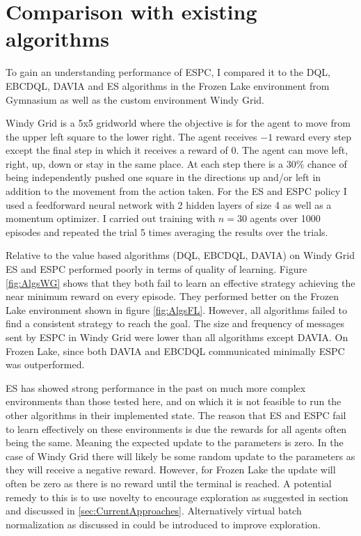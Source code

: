 \section{Comparison with existing algorithms}
To gain an understanding performance of ESPC, I compared it to the DQL, EBCDQL, DAVIA and ES algorithms in the Frozen Lake environment from Gymnasium as well as the custom environment Windy Grid.

Windy Grid is a 5x5 gridworld where the objective is for the agent to move from the upper left square to the lower right. The agent receives $-1$ reward every step except the final step in which it receives a reward of $0$. The agent can move left, right, up, down or stay in the same place. At each step there is a $30\%$ chance of being independently pushed one square in the directions up and/or left in addition to the movement from the action taken. For the ES and ESPC policy I used a feedforward neural network with 2 hidden layers of size 4 as well as a momentum optimizer.
I carried out training with $n=30$ agents over 1000 episodes and repeated the trial 5 times averaging the results over the trials. 

Relative to the value based algorithms (DQL, EBCDQL, DAVIA) on Windy Grid ES and ESPC performed poorly in terms of quality of learning. Figure \ref{fig:AlgsWG} shows that they both fail to learn an effective strategy achieving the near minimum reward on every episode. They performed better on the Frozen Lake environment shown in figure \ref{fig:AlgsFL}. However, all algorithms failed to find a consistent strategy to reach the goal. The size and frequency of messages sent by ESPC in Windy Grid were lower than all algorithms except DAVIA. On Frozen Lake, since both DAVIA and EBCDQL communicated minimally ESPC was outperformed.

ES has showed strong performance in the past on much more complex environments than those tested here, and on which it is not feasible to run the other algorithms in their implemented state. The reason that ES and ESPC fail to learn effectively on these environments is due the rewards for all agents often being the same. Meaning the expected update to the parameters is zero. In the case of Windy Grid there will likely be some random update to the parameters as they will receive a negative reward. However, for Frozen Lake the update will often be zero as there is no reward until the terminal is reached.
A potential remedy to this is to use novelty to encourage exploration as suggested in section \cite{NS-ES} and discussed in \ref{sec:CurrentApproaches}.
Alternatively virtual batch normalization as discussed in \cite{VBN} could be introduced to improve exploration.

